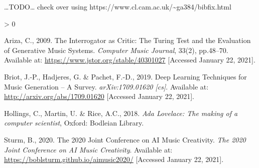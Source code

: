 \documentclass[12pt,a4paper,]{report}
\newlength{\cslhangindent}
\newenvironment{CSLReferences}[2] %
 {%
  \setlength{\parindent}{0pt}
  \ifodd #1 \everypar{\setlength{\hangindent}{\cslhangindent}}\ignorespaces\fi
  \ifnum #2 > 0
  \setlength{\parskip}{#2\baselineskip}
  \fi
 }%
 {}
\begin{document}
\ldots TODO\ldots{} check over using
https://www.cl.cam.ac.uk/\textasciitilde ga384/bibfix.html

\hypertarget{refs}{}
\begin{CSLReferences}{1}{0}
\leavevmode\hypertarget{ref-ariza_interrogator_2009}{}%
Ariza, C., 2009. The {Interrogator} as {Critic}: {The} {Turing} {Test}
and the {Evaluation} of {Generative} {Music} {Systems}. \emph{Computer
Music Journal}, 33(2), pp.48--70. Available at:
\url{https://www.jstor.org/stable/40301027} {[}Accessed January 22,
2021{]}.

\leavevmode\hypertarget{ref-briot_deep_2019}{}%
Briot, J.-P., Hadjeres, G. \& Pachet, F.-D., 2019. Deep {Learning}
{Techniques} for {Music} {Generation} -- {A} {Survey}.
\emph{arXiv:1709.01620 {[}cs{]}}. Available at:
\url{http://arxiv.org/abs/1709.01620} {[}Accessed January 22, 2021{]}.

\leavevmode\hypertarget{ref-hollings_ada_2018}{}%
Hollings, C., Martin, U. \& Rice, A.C., 2018. \emph{Ada {Lovelace}: The
making of a computer scientist}, Oxford: Bodleian Library.

\leavevmode\hypertarget{ref-sturm_2020_2020}{}%
Sturm, B., 2020. The 2020 {Joint} {Conference} on {AI} {Music}
{Creativity}. \emph{The 2020 Joint Conference on AI Music Creativity}.
Available at: \url{https://boblsturm.github.io/aimusic2020/} {[}Accessed
January 22, 2021{]}.

\end{CSLReferences}
\end{document}
